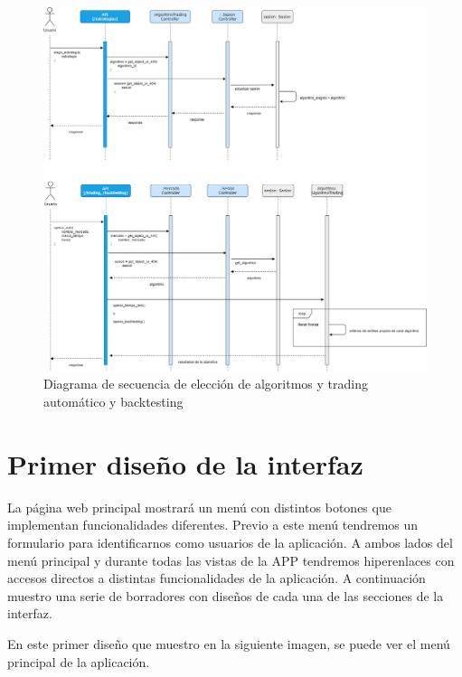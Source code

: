 \begin{figure}[h] 
	\includegraphics[width=1.35\textwidth]{imagenes/diagramas_secuencia/algoritmos_secuencia.png}
	\caption{Diagrama de secuencia de elección de algoritmos y trading automático y backtesting} \label{algoritmos_secuencia}
\end{figure}

\section{Primer diseño de la interfaz} \label{primer_diseño}

La página web principal mostrará un menú con distintos botones que implementan funcionalidades diferentes. Previo a este menú tendremos un formulario para identificarnos como usuarios de la aplicación. A ambos lados del menú principal y durante todas las vistas de la APP tendremos hiperenlaces con accesos directos a distintas funcionalidades de la aplicación. A continuación muestro una serie de borradores con diseños de cada una de las secciones de la interfaz.\newline

En este primer diseño que muestro en la siguiente imagen, se puede ver el menú principal de la aplicación.\newline


